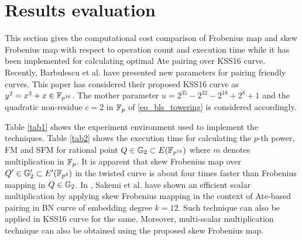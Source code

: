 \section{Results evaluation}
This section gives the computational cost comparison of Frobenius map and skew Frobenius map  with respect to operation count and execution time while it has been implemented for calculating optimal Ate pairing over KSS16 curve. Recently, Barbulescu et al. \cite{sulvain_new_param} have presented new parameters for pairing friendly curves. This paper has considered their proposed KSS16 curve as $y^2=x^3+x \in \mathbb{F}_{p^{16}}$. The mother parameter $ u=2^{35}-2^{32}-2^{18}+2^{8}+1$ and the quadratic non-residue  $c=2$ in $\mathbb{F}_p$ of \eqref{eq_bls_towering} is considered accordingly.

Table \ref{tab1} shows the experiment environment used to implement the techniques. Table \ref{tab2} shows the execution time for calculating the $p$-th power, FM and SFM for rational point $Q \in {\mathbb{G}}_{2} \subset E(\mathbb{F}_{p^{16}})$ where $m$ denotes multiplication in $\mathbb{F}_p$.  It is apparent that skew Frobenius map over $Q' \in {\mathbb{G}}_{2}' \subset E'(\mathbb{F}_{p^4})$ in the twisted curve is about four times faster than Frobenius mapping in  $Q \in {\mathbb{G}}_{2}$. In \cite{sakemi_skew}, Sakemi et al. have shown an efficient scalar multiplication by applying skew Frobenius mapping in the context of Ate-based pairing in BN curve of embedding degree $k=12$. Such technique can also be applied in KSS16 curve for the same. Moreover, multi-scalar multiplication technique can also be obtained using the proposed skew Frobenius map.
\renewcommand{\baselinestretch}{1.5}
\begin{table}[!ht]
\centering
\caption{ Computational Environment}
\label{tab1}
\end{table}
